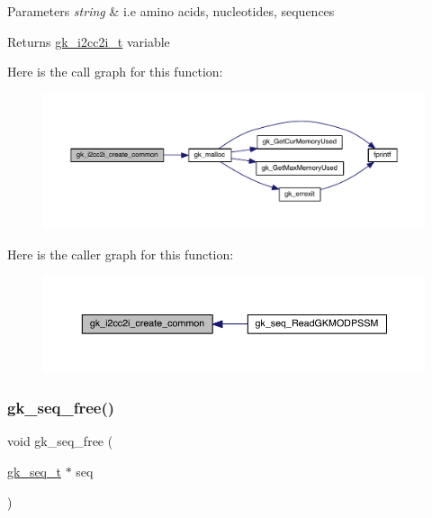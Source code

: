 \begin{DoxyParams}{Parameters}
{\em string} & i.\+e amino acids, nucleotides, sequences \\
\hline
\end{DoxyParams}
\begin{DoxyReturn}{Returns}
\hyperlink{a00670}{gk\+\_\+i2cc2i\+\_\+t} variable 
\end{DoxyReturn}
Here is the call graph for this function\+:\nopagebreak
\begin{figure}[H]
\begin{center}
\leavevmode
\includegraphics[width=350pt]{a00137_a8b9f1e33d58df397a7f0f923a25ec256_cgraph}
\end{center}
\end{figure}
Here is the caller graph for this function\+:\nopagebreak
\begin{figure}[H]
\begin{center}
\leavevmode
\includegraphics[width=350pt]{a00137_a8b9f1e33d58df397a7f0f923a25ec256_icgraph}
\end{center}
\end{figure}
\mbox{\label{a00137_ac3ecbea172370c2a661afecad60b5685}} 
\subsubsection{\texorpdfstring{gk\+\_\+seq\+\_\+free()}{gk\_seq\_free()}}
{\footnotesize\ttfamily void gk\+\_\+seq\+\_\+free (\begin{DoxyParamCaption}\item[{\hyperlink{a00674}{gk\+\_\+seq\+\_\+t} $\ast$}]{seq }\end{DoxyParamCaption})}



